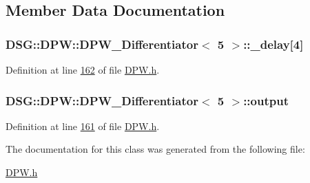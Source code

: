 \subsection{Member Data Documentation}
\hypertarget{class_d_s_g_1_1_d_p_w_1_1_d_p_w___differentiator_3_015_01_4_afc272a1eb4f3240b4148a64c7c9ccfc1}{
\subsubsection[{\+\_\+delay}]{ {\bf D\+S\+G\+::\+D\+P\+W\+::\+D\+P\+W\+\_\+\+Differentiator}$<$ 5 $>$\+::\+\_\+delay\mbox{[}4\mbox{]}\hspace{0.3cm}{\ttfamily [protected]}}}\label{class_d_s_g_1_1_d_p_w_1_1_d_p_w___differentiator_3_015_01_4_afc272a1eb4f3240b4148a64c7c9ccfc1}


Definition at line \hyperlink{_d_p_w_8h_source_l00162}{162} of file \hyperlink{_d_p_w_8h_source}{D\+P\+W.\+h}.

\hypertarget{class_d_s_g_1_1_d_p_w_1_1_d_p_w___differentiator_3_015_01_4_ae69bdfd7eb71c3c44691bda6067bda0c}{
\subsubsection[{output}]{ {\bf D\+S\+G\+::\+D\+P\+W\+::\+D\+P\+W\+\_\+\+Differentiator}$<$ 5 $>$\+::output\hspace{0.3cm}{\ttfamily [protected]}}}\label{class_d_s_g_1_1_d_p_w_1_1_d_p_w___differentiator_3_015_01_4_ae69bdfd7eb71c3c44691bda6067bda0c}


Definition at line \hyperlink{_d_p_w_8h_source_l00161}{161} of file \hyperlink{_d_p_w_8h_source}{D\+P\+W.\+h}.



The documentation for this class was generated from the following file\+:\begin{DoxyCompactItemize}
\item 
\hyperlink{_d_p_w_8h}{D\+P\+W.\+h}\end{DoxyCompactItemize}
